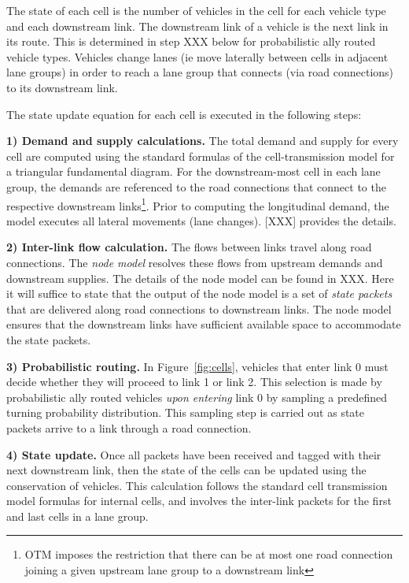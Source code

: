 The state of each cell is the number of vehicles in the cell for each vehicle type and each downstream link. The downstream link of a vehicle is the next link in its route. This is determined in step XXX below for probabilistic ally routed vehicle types. Vehicles change lanes (ie move laterally between cells in adjacent lane groups) in order to reach a lane group that connects (via road connections) to its downstream link. 

The state update equation for each cell is executed in the following steps:

\vspace{1em} \noindent \textbf{1) Demand and supply calculations.} The total demand and supply for every cell are computed using the standard formulas of the cell-transmission model for a triangular fundamental diagram. For the downstream-most cell in each lane group, the demands are referenced to the road connections that connect to the respective downstream links\footnote{OTM imposes the restriction that there can be at most one road connection joining a given upstream lane group to a downstream link}. Prior to computing the longitudinal demand, the model executes all lateral movements (lane changes). [XXX] provides the details. 

\vspace{1em}\noindent \textbf{2) Inter-link flow calculation.} The flows between links travel along road connections. The \textit{node model} resolves these flows from upstream demands and downstream supplies. The details of the node model can be found in XXX. Here it will suffice to state that the output of the node model is a set of \textit{state packets} that are delivered along road connections to downstream links. The node model ensures that the downstream links have sufficient available space to accommodate the state packets.  

\vspace{1em}\noindent \textbf{3) Probabilistic routing.} 
In Figure~\ref{fig:cells}, vehicles that enter link 0 must decide whether they will proceed to link 1 or link 2. This selection is made by probabilistic ally routed vehicles \textit{upon entering} link 0 by sampling a predefined turning probability distribution. This sampling step is carried out as state packets arrive to a link through a road connection. 

\vspace{1em} \noindent \textbf{4) State update.} Once all packets have been received and tagged with their next downstream link, then the state of the cells can be updated using the conservation of vehicles. This calculation follows the standard cell transmission model formulas for internal cells, and involves the inter-link packets for the first and last cells in a lane group. 

